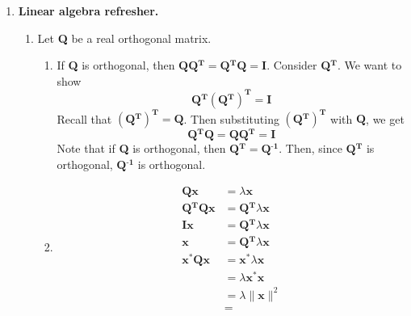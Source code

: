 \documentclass [12pt] {article}
\newcommand{\QT}{\bf{Q$^{\bf{T}}$}}
\newcommand{\QI}{\bf{Q$^{\bf{-1}}$}}
\newcommand{\QQ}{\bf{Q}}
\renewcommand{\bf}[1]{\textbf{{#1}}}
\begin{document}
\begin{enumerate}
    \item \bf{Linear algebra refresher.}
        \begin{enumerate}
            \item Let \QQ {} be a real orthogonal matrix.
                \begin{enumerate}
                    \item If \QQ {} is orthogonal, then $\QQ \QT = \QT \QQ = \bf{I}$. Consider \QT. We
                        want to show \[\QT \left(\QT\right)^{\bf{T}} = \bf{I}\]
                        Recall that $\left(\QT\right)^{\bf{T}} = \QQ$. Then substituting 
                        $\left(\QT\right)^{\bf{T}}$ with $\QQ$, we get 
                        \[\QT \QQ = \QQ \QT = \bf{I}\]
                        Note that if \QQ {} is orthogonal, then $\QT = \QI$. Then, since $\QT$ is 
                        orthogonal, $\QI$ is orthogonal.
                    \item 
                        \begin{align*}
                            \QQ \bf{x} &= \lambda \bf{x} \\
                            \QT \QQ \bf{x} &= \QT \lambda \bf{x} \\
                            \bf{Ix} &= \QT \lambda \bf{x} \\
                            \bf{x} &= \QT \lambda \bf{x} \\
                            \bf{x}^* \QQ \bf{x} &= \bf{x}^* \lambda \bf{x} \\
                                                &= \lambda \bf{x}^* \bf{x} \\
                                                &= \lambda \|\bf{x}\|^2 \\
                                                &= 
                        \end{align*}
                \end{enumerate}
        \end{enumerate}
\end{enumerate}
\end{document}
